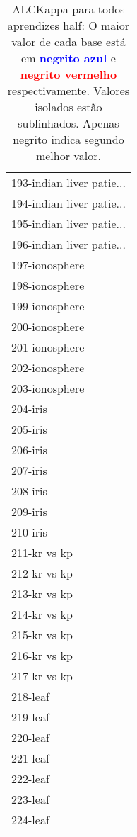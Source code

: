 \begin{table}[h]
\caption{ALCKappa para todos aprendizes half: O maior valor de cada base está em \textcolor{blue}{\textbf{negrito azul}} e \textcolor{red}{\textbf{negrito vermelho}} respectivamente. Valores isolados estão sublinhados. Apenas negrito indica segundo melhor valor.}
\begin{center}\begin{tabular}{l}
 & \\ \hline 193-indian liver patie... &  \\
194-indian liver patie... &  \\
195-indian liver patie... &  \\
196-indian liver patie... &  \\
197-ionosphere &  \\
198-ionosphere &  \\
199-ionosphere &  \\ \hline
200-ionosphere &  \\
201-ionosphere &  \\
202-ionosphere &  \\
203-ionosphere &  \\
204-iris &  \\
205-iris &  \\
206-iris &  \\ \hline
207-iris &  \\
208-iris &  \\
209-iris &  \\
210-iris &  \\
211-kr vs kp &  \\
212-kr vs kp &  \\
213-kr vs kp &  \\ \hline
214-kr vs kp &  \\
215-kr vs kp &  \\
216-kr vs kp &  \\
217-kr vs kp &  \\
218-leaf &  \\
219-leaf &  \\
220-leaf &  \\ \hline
221-leaf &  \\
222-leaf &  \\
223-leaf &  \\
224-leaf &  \\\end{tabular}\label{stratsALCKappa6AllReduxHalfb}
\end{center}
\end{table}
